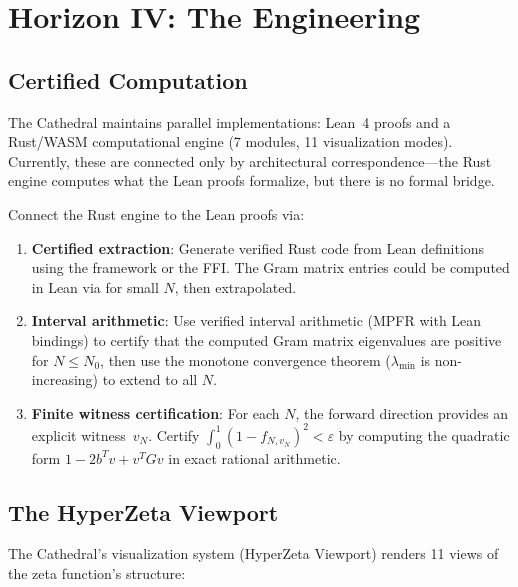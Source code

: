 \documentclass[11pt,a4paper]{article}
\begin{document}
\section{Horizon IV: The Engineering}
\label{sec:engineering}

\subsection{Certified Computation}

The Cathedral maintains parallel implementations: Lean~4 proofs and a
Rust/WASM computational engine (7 modules, 11 visualization modes).
Currently, these are connected only by architectural correspondence---the
Rust engine computes what the Lean proofs formalize, but there is no
formal bridge.

\begin{direction}
Connect the Rust engine to the Lean proofs via:
\begin{enumerate}
  \item \textbf{Certified extraction}: Generate verified Rust code from
    Lean definitions using the  framework or the
    FFI. The Gram matrix entries could be computed in Lean via
     for small $N$, then extrapolated.
  \item \textbf{Interval arithmetic}: Use verified interval arithmetic
    (MPFR with Lean bindings) to certify that the computed Gram matrix
    eigenvalues are positive for $N \le N_0$, then use the monotone
    convergence theorem ($\lambda_{\min}$ is non-increasing) to extend
    to all $N$.
  \item \textbf{Finite witness certification}: For each $N$, the
    forward direction provides an explicit witness~$v_N$. Certify
    $\int_0^1 (1 - f_{N,v_N})^2 < \varepsilon$ by computing the
    quadratic form $1 - 2b^T v + v^T G v$ in exact rational arithmetic.
\end{enumerate}
\end{direction}

\subsection{The HyperZeta Viewport}

The Cathedral's visualization system (HyperZeta Viewport) renders 11
views of the zeta function's structure:
\end{document}
